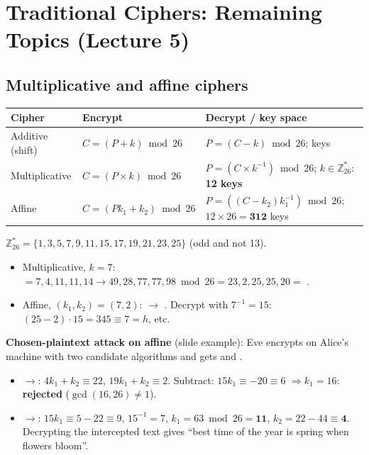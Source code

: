 \section{Traditional Ciphers: Remaining Topics (Lecture 5)}\label{sec:classextra}

\subsection{Multiplicative and affine ciphers}
\begin{center}\small
\begin{tabular}{@{}lll@{}}
\toprule
Cipher & Encrypt & Decrypt / key space\\
\midrule
Additive (shift) & $C = (P + k) \bmod 26$ & $P = (C - k) \bmod 26$; \; 26 keys\\
Multiplicative & $C = (P \times k) \bmod 26$ & $P = (C \times k^{-1}) \bmod 26$; \; $k \in \mathbb{Z}_{26}^*$: \textbf{12 keys}\\
Affine & $C = (P k_1 + k_2) \bmod 26$ & $P = ((C - k_2) k_1^{-1}) \bmod 26$; \; $12 \times 26 = \mathbf{312}$ keys\\
\bottomrule
\end{tabular}
\end{center}
$\mathbb{Z}_{26}^* = \{1, 3, 5, 7, 9, 11, 15, 17, 19, 21, 23, 25\}$ (odd and not 13).
\begin{itemize}
  \item Multiplicative, $k = 7$:  $= 7, 4, 11, 11, 14 \to 49, 28, 77, 77, 98 \bmod 26 = 23, 2, 25, 25, 20 =$ .
  \item Affine, $(k_1, k_2) = (7, 2)$:  $\to$ . Decrypt with $7^{-1} = 15$: $(25 - 2) \cdot 15 = 345 \equiv 7 = h$, etc.
\end{itemize}

\textbf{Chosen-plaintext attack on affine} (slide example): Eve encrypts  on Alice's machine with two candidate algorithms and gets  and .
\begin{itemize}
  \item {}$\to$: $4k_1 + k_2 \equiv 22$, $19k_1 + k_2 \equiv 2$. Subtract: $15k_1 \equiv -20 \equiv 6$ $\Rightarrow k_1 = 16$: \textbf{rejected} ($\gcd(16, 26) \ne 1$).
  \item {}$\to$: $15k_1 \equiv 5 - 22 \equiv 9$, $15^{-1} = 7$, $k_1 = 63 \bmod 26 = \mathbf{11}$, $k_2 = 22 - 44 \equiv \mathbf{4}$. Decrypting the intercepted text gives ``best time of the year is spring when flowers bloom''.
\end{itemize}


